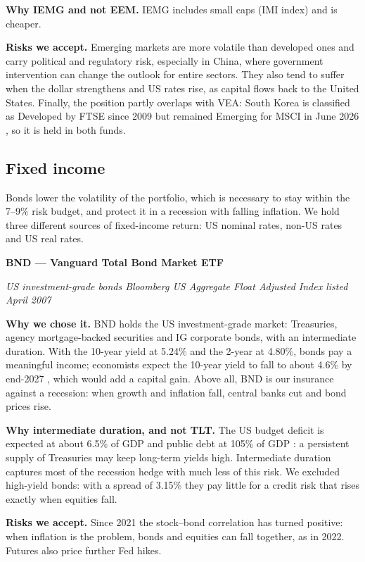 \textbf{Why IEMG and not EEM.} IEMG includes small caps (IMI index) and
is cheaper.

\textbf{Risks we accept.} Emerging markets are more volatile than
developed ones and carry political and regulatory risk, especially in
China, where government intervention can change the outlook for entire
sectors. They also tend to suffer when the dollar strengthens and US
rates rise, as capital flows back to the United States. Finally, the
position partly overlaps with VEA: South Korea is classified as
Developed by FTSE since 2009 \cite{ftsekorea} but remained Emerging for MSCI in
June 2026 \cite{koreatimes}, so it is held in both funds.

\subsection*{Fixed income}\label{sec:fixed-income}

Bonds lower the volatility of the portfolio, which is necessary to stay
within the 7--9\% risk budget, and protect it in a recession with
falling inflation. We hold three different sources of fixed-income
return: US nominal rates, non-US rates and US real rates.

\textbf{BND --- Vanguard Total Bond Market ETF}

\emph{US investment-grade bonds \textperiodcentered{} Bloomberg US Aggregate Float Adjusted
Index \textperiodcentered{} listed April 2007}

\textbf{Why we chose it.} BND holds the US investment-grade market:
Treasuries, agency mortgage-backed securities and IG corporate bonds,
with an intermediate duration. With the 10-year yield at 5.24\% and the
2-year at 4.80\%, bonds pay a meaningful income; economists expect the
10-year yield to fall to about 4.6\% by end-2027 \cite{ecfc}, which would
add a capital gain. Above all, BND is our insurance against a recession:
when growth and inflation fall, central banks cut and bond prices rise.

\textbf{Why intermediate duration, and not TLT.} The US budget deficit
is expected at about 6.5\% of GDP and public debt at 105\% of GDP
\cite{ecfc}: a persistent supply of Treasuries may keep long-term yields
high. Intermediate duration captures most of the recession hedge with
much less of this risk. We excluded high-yield bonds: with a spread of
3.15\% they pay little for a credit risk that rises exactly when
equities fall.

\textbf{Risks we accept.} Since 2021 the stock--bond correlation has
turned positive: when inflation is the problem, bonds and equities can
fall together, as in 2022. Futures also price further Fed hikes.

